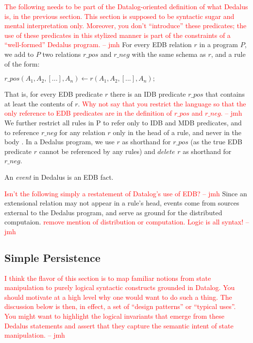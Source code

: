 \documentclass{acm_proc_article-sp-sigmod09}
\newcommand{\jmh}[1]{{\textcolor{red}{#1 -- jmh}}}
\newcommand{\paa}[1]{{\textcolor{blue}{#1 -- paa}}}
\newcommand{\wrm}[1]{{\color{BurntOrange}{#1 -- wrm}}}
\begin{document}
\jmh{The following needs to be part of the Datalog-oriented definition of what Dedalus is, in the previous section.  This section is supposed to be syntactic sugar and mental interpretation only.  Moreover, you don't ``introduce'' these predicates; the use of these predicates in this stylized manner is part of the constraints of a ``well-formed'' Dedalus program.}
For every EDB relation $r$ in a program $P$, we add to $P$ two relations
$r\_pos$ and $r\_neg$ with the same schema as $r$, and a rule of the form:

$r\_pos(A_1, A_2, [...], A_n) \leftarrow r(A_1, A_2, [...], A_n);$

\wrm{Are we missing the time suffixes here?} That is, for every EDB predicate
$r$ there is an IDB predicate $r\_pos$ that contains at least the contents of
$r$.  
\jmh{Why not say that you restrict the language so that the only reference to EDB predicates are in the definition of $r\_pos$ and $r\_neg$.}
We further restrict all rules in P to refer only to IDB and MDB
predicates, and to reference $r\_neg$ for any relation $r$ only in the head of
a rule, and never in the body \wrm{then, how do we write persistence rules?}.
In a Dedalus program, we use $r$ as shorthand for $r\_pos$ (as the true EDB
predicate $r$ cannot be referenced by any rules) and $delete$ $r$ as shorthand
for $r\_neg$.

\begin{definition}
%
An \emph{event} in Dedalus is an EDB fact.
%
\end{definition}

\jmh{Isn't the following simply a restatement of Datalog's use of EDB?}
Since an extensional relation may not appear in a rule's head, events come from
sources external to the Dedalus program, and serve as ground for the
distributed computaion.  \jmh{remove mention of distribution or computation.  Logic is all syntax!}

\subsection{Simple Persistence}
\jmh{I think the flavor of this section is to map familiar notions from state manipulation to purely logical syntactic constructs grounded in Datalog.  You should motivate at a high level why one would want to do such a thing.  The discussion below is then, in effect, a set of ``design patterns'' or ``typical uses''.  You might want to highlight the logical invariants that emerge from these Dedalus statements and assert that they capture the semantic intent of state manipulation.}
\end{document}
